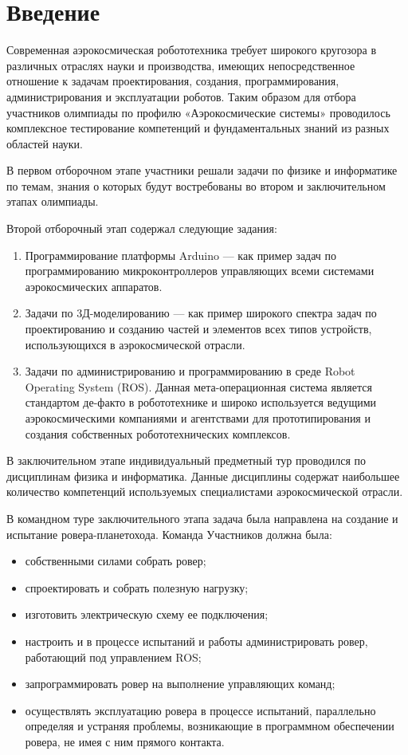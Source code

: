 %
\begingroup
\pagestyle{empty}

\section*{Введение}

Современная аэрокосмическая робототехника требует широкого кругозора в различных отраслях науки и производства, имеющих непосредственное отношение к задачам проектирования, создания, программирования, администрирования и эксплуатации роботов. Таким образом для отбора участников олимпиады по профилю «Аэрокосмические системы» проводилось комплексное тестирование компетенций и фундаментальных знаний из разных областей науки.

В первом отборочном этапе участники решали задачи по физике и информатике по темам, знания о которых будут востребованы во втором и заключительном этапах олимпиады.

Второй отборочный этап содержал следующие задания:
\begin{enumerate}
    \item Программирование платформы Arduino — как пример задач по программированию микроконтроллеров управляющих всеми системами аэрокосмических аппаратов.
    \item Задачи по 3Д-моделированию — как пример широкого спектра задач по проектированию и созданию частей и элементов всех типов устройств, использующихся в аэрокосмической отрасли.
    \item Задачи по администрированию и программированию в среде Robot Operating System (ROS). Данная мета-операционная система является стандартом де-факто в робототехнике и широко используется ведущими аэрокосмическими компаниями и агентствами для прототипирования и создания собственных робототехнических комплексов.
\end{enumerate}

В заключительном этапе индивидуальный предметный тур проводился по дисциплинам физика и информатика. Данные дисциплины содержат наибольшее количество компетенций используемых специалистами аэрокосмической отрасли.

В командном туре заключительного этапа задача была направлена на создание и испытание ровера-планетохода. Команда Участников должна была:
\begin{itemize}
    \item собственными силами собрать ровер;
    \item спроектировать и собрать полезную нагрузку;
    \item изготовить электрическую схему ее подключения;
    \item настроить и в процессе испытаний и работы администрировать ровер, работающий под управлением ROS;
    \item запрограммировать ровер на выполнение управляющих команд;
    \item осуществлять эксплуатацию ровера в процессе испытаний, параллельно определяя и устраняя проблемы, возникающие в программном обеспечении ровера, не имея с ним прямого контакта.
\end{itemize}

